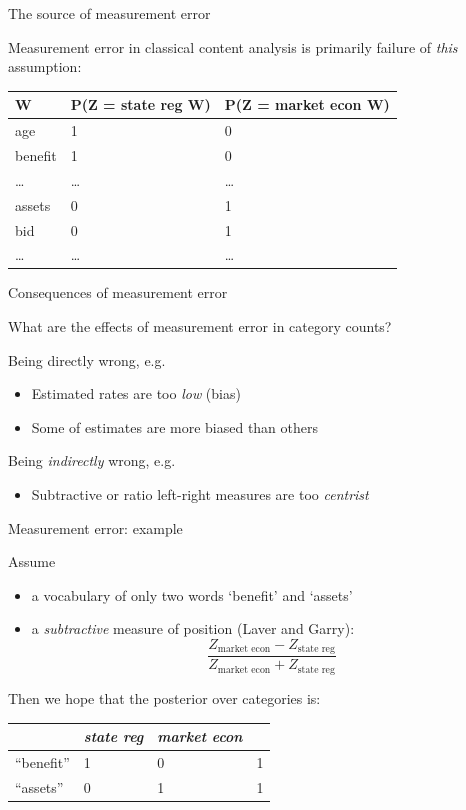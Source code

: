 \documentclass{hertieteaching}
\begin{document}
\begin{frame}{The source of measurement error}
\protect\hypertarget{the-source-of-measurement-error}{}

Measurement error in classical content analysis is primarily failure of
\emph{this} assumption:

\begin{longtable}[]{@{}lll@{}}
\toprule
W & P(Z = state reg \textbar{} W) & P(Z = market econ \textbar{}
W)\tabularnewline
\midrule
\endhead
age & 1 & 0\tabularnewline
benefit & 1 & 0\tabularnewline
\ldots{} & \ldots{} & \ldots{}\tabularnewline
assets & 0 & 1\tabularnewline
bid & 0 & 1\tabularnewline
\ldots{} & \ldots{} & \ldots{}\tabularnewline
\bottomrule
\end{longtable}

\end{frame}

\begin{frame}{Consequences of measurement error}
\protect\hypertarget{consequences-of-measurement-error}{}

What are the effects of measurement error in category counts?

Being directly wrong, e.g.

\begin{itemize}
\item
  Estimated rates are too \emph{low} (bias)\item
  Some of estimates are more biased than others
\end{itemize}

Being \emph{indirectly} wrong, e.g.

\begin{itemize}
\item
  Subtractive or ratio left-right measures are too \emph{centrist}
\end{itemize}

\end{frame}

\begin{frame}{Measurement error: example}
\protect\hypertarget{measurement-error-example}{}

Assume

\begin{itemize}
\item
  a vocabulary of only two words `benefit' and `assets'\item
  a \emph{subtractive} measure of position (Laver and Garry): \[
  \frac{Z_\text{market econ} - Z_\text{state reg}}
       {Z_\text{market econ} + Z_\text{state reg}}
  \]
\end{itemize}

Then we hope that the posterior over categories is:

\begin{longtable}[]{@{}llll@{}}
\toprule
& \emph{state reg} & \emph{market econ} &\tabularnewline
\midrule
\endhead
``benefit'' & 1 & 0 & 1\tabularnewline
``assets'' & 0 & 1 & 1\tabularnewline
\bottomrule
\end{longtable}

\end{frame}
\end{document}
